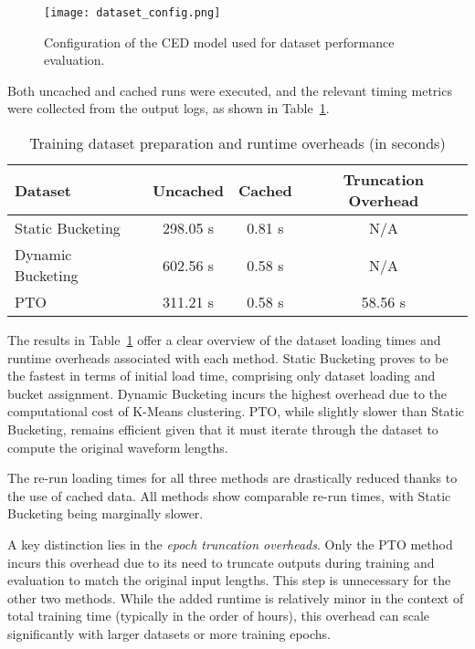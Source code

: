 \begin{figure}[H]
    \centering
    \texttt{[image: dataset\_config.png]}
    \caption{\label{fig:dataset_config} Configuration of the CED model used for dataset performance evaluation.}
\end{figure}

Both uncached and cached runs were executed, and the relevant timing metrics were collected from the output logs, as shown in Table~\ref{tab:dataset_loading_times}.

\vspace{1em}
\begin{table}[H]
\centering
\caption{Training dataset preparation and runtime overheads (in seconds)}
\label{tab:dataset_loading_times}
\begin{tabular}{|l|c|c|c|}
\hline
\textbf{Dataset} & \textbf{Uncached} & \textbf{Cached} & \textbf{Truncation Overhead} \\
\hline
Static Bucketing  & 298.05 s  & 0.81 s   & N/A    \\
Dynamic Bucketing & 602.56 s& 0.58 s  & N/A    \\
PTO               & 311.21 s & 0.58 s  & 58.56 s  \\
\hline
\end{tabular}
\end{table}

The results in Table~\ref{tab:dataset_loading_times} offer a clear overview of the dataset loading times and runtime overheads associated with each method. Static Bucketing proves to be the fastest in terms of initial load time, comprising only dataset loading and bucket assignment. Dynamic Bucketing incurs the highest overhead due to the computational cost of K-Means clustering. PTO, while slightly slower than Static Bucketing, remains efficient given that it must iterate through the dataset to compute the original waveform lengths.

The re-run loading times for all three methods are drastically reduced thanks to the use of cached data. All methods show comparable re-run times, with Static Bucketing being marginally slower.

A key distinction lies in the \textit{epoch truncation overheads}. Only the PTO method incurs this overhead due to its need to truncate outputs during training and evaluation to match the original input lengths. This step is unnecessary for the other two methods. While the added runtime is relatively minor in the context of total training time (typically in the order of hours), this overhead can scale significantly with larger datasets or more training epochs.

